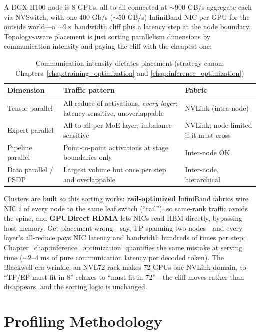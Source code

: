 A DGX H100 node is 8 GPUs, all-to-all connected at $\sim$900 GB/s aggregate each via NVSwitch, with one 400 Gb/s ($\sim$50 GB/s) InfiniBand NIC per GPU for the outside world---a $\sim$9$\times$ bandwidth cliff plus a latency step at the node boundary. Topology-aware placement is just sorting parallelism dimensions by communication intensity and paying the cliff with the cheapest one:

\begin{table}[H]
\centering
\small
\caption{Communication intensity dictates placement (strategy canon: Chapters~\ref{chap:training_optimization} and \ref{chap:inference_optimization})}
\label{tab:topology_placement}
\begin{tabularx}{\textwidth}{lXl}
\toprule
\textbf{Dimension} & \textbf{Traffic pattern} & \textbf{Fabric} \\
\midrule
Tensor parallel & All-reduce of activations, \textit{every layer}; latency-sensitive, unoverlappable & NVLink (intra-node) \\
Expert parallel & All-to-all per MoE layer; imbalance-sensitive & NVLink; node-limited if it must cross \\
Pipeline parallel & Point-to-point activations at stage boundaries only & Inter-node OK \\
Data parallel / FSDP & Largest volume but once per step and overlappable & Inter-node, hierarchical \\
\bottomrule
\end{tabularx}
\end{table}

Clusters are built so this sorting works: \textbf{rail-optimized} InfiniBand fabrics wire NIC $i$ of every node to the same leaf switch (``rail''), so same-rank traffic avoids the spine, and \textbf{GPUDirect RDMA} lets NICs read HBM directly, bypassing host memory. Get placement wrong---say, TP spanning two nodes---and every layer's all-reduce pays NIC latency and bandwidth hundreds of times per step; Chapter~\ref{chap:inference_optimization} quantifies the same mistake at serving time ($\sim$2--4 ms of pure communication latency per decoded token). The Blackwell-era wrinkle: an NVL72 rack makes 72 GPUs one NVLink domain, so ``TP/EP must fit in 8'' relaxes to ``must fit in 72''---the cliff moves rather than disappears, and the sorting logic is unchanged.

\section{Profiling Methodology}
\label{sec:gpu_profiling}

